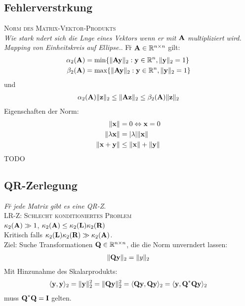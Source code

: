 \subsection{Fehlerverst\a rkung}
\textsc{Norm des Matrix-Vektor-Produkts}\\
\emph{Wie stark \a ndert sich die L\a nge eines Vektors wenn er mit $\mbox{\bf A}$ multipliziert wird. Mapping von Einheitskreis auf Ellipse.}.
F\u r $\mbox{\bf A} \in \mathbb{R}^{n \times n}$ gilt:
\begin{align*}
\alpha_2(\mbox{\bf A}) &= \min\{\Vert \mbox{\bf Ay} \Vert_2 : \mbox{\bf y}\in\mathbb{R}^{n}, \Vert \mbox{\bf y} \Vert_2 =1 \} \\
\beta_2(\mbox{\bf A}) &= \max\{\Vert \mbox{\bf Ay} \Vert_2 : \mbox{\bf y}\in\mathbb{R}^{n}, \Vert \mbox{\bf y} \Vert_2 =1 \} 
\end{align*}
und
\begin{align*}
\alpha_2(\mbox{\bf A})\Vert \mbox{\bf z} \Vert_2 \leq \Vert \mbox{\bf Az} \Vert_2 \leq \beta_2(\mbox{\bf A})\Vert \mbox{\bf z} \Vert_2
\end{align*}
Eigenschaften der Norm:
\begin{align*}
\Vert \mbox{\bf x} \Vert &= 0 \Leftrightarrow \mbox{\bf x} = 0 \\
\Vert \lambda \mbox{\bf x} \Vert &= | \lambda | \Vert \mbox{\bf x} \Vert \\
\Vert \mbox{\bf x} + \mbox{\bf y} \Vert &\leq \Vert \mbox{\bf x} \Vert+\Vert \mbox{\bf y} \Vert
\end{align*}
TODO

\subsection{QR-Zerlegung}
\emph{F\u r jede Matrix gibt es eine QR-Z}.\\

\textsc{LR-Z: Schlecht konditioniertes Problem}\\
$\kappa_2(\mbox{\bf A}) \gg 1$, $\kappa_2(\mbox{\bf A}) \leq \kappa_2(\mbox{\bf L})\kappa_2(\mbox{\bf R})$\\
Kritisch falls $\kappa_2(\mbox{\bf L})\kappa_2(\mbox{\bf R}) \gg \kappa_2(\mbox{\bf A})$.\\

Ziel: Suche Transformationen $\mbox{\bf Q} \in \mathbb{R}^{n \times n}$, die die Norm unver\a ndert lassen:
\begin{align*}
\Vert \mbox{\bf Qy} \Vert_2 = \Vert y \Vert_2
\end{align*}
Mit Hinzunahme des Skalarprodukts:
\begin{align*}
\langle \mbox{\bf y}, \mbox{\bf y} \rangle_2 = \Vert \mbox{\bf y} \Vert_2^2 = \Vert \mbox{\bf Qy} \Vert_2^2 = \langle \mbox{\bf Qy}, \mbox{\bf Qy} \rangle_2 = \langle \mbox{\bf y}, \mbox{\bf Q}^*\mbox{\bf Qy} \rangle_2
\end{align*}
muss $\mbox{\bf Q}^*\mbox{\bf Q} = \mbox{\bf I}$ gelten.

